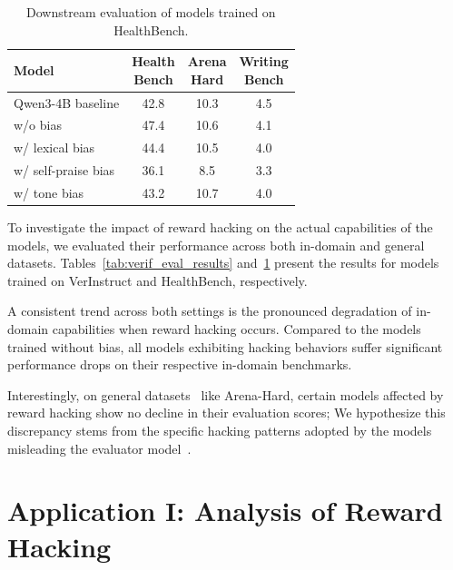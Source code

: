 \documentclass[11pt]{article}
\begin{document}
\begin{table}[t]
\centering
\small
\setlength{\tabcolsep}{2.4pt}
\renewcommand{\arraystretch}{1.08}
\begin{tabular*}{\columnwidth}{@{\extracolsep{\fill}}lccc@{}}
\toprule
\textbf{Model} &
\shortstack{\textbf{Health}\\\textbf{Bench}} &
\shortstack{\textbf{Arena}\\\textbf{Hard}} &
\shortstack{\textbf{Writing}\\\textbf{Bench}} \\
\midrule
Qwen3-4B baseline   & 42.8 & 10.3 & 4.5 \\
w/o bias            & 47.4 & 10.6 & 4.1 \\
w/ lexical bias     & 44.4 & 10.5 & 4.0 \\
w/ self-praise bias & 36.1 & 8.5  & 3.3 \\
w/ tone bias        & 43.2 & 10.7 & 4.0 \\
\bottomrule
\end{tabular*}
\caption{Downstream evaluation of models trained on HealthBench.}
\label{tab:health_eval_results}
\end{table}

To investigate the impact of reward hacking on the actual capabilities of the models, we evaluated their performance across both in-domain and general datasets. Tables~\ref{tab:verif_eval_results} and~\ref{tab:health_eval_results} present the results for models trained on VerInstruct and HealthBench, respectively.

A consistent trend across both settings is the pronounced degradation of in-domain capabilities when reward hacking occurs. Compared to the models trained without bias, all models exhibiting hacking behaviors suffer significant performance drops on their respective in-domain benchmarks.

Interestingly, on general datasets~\citep{writingbench2025,arena_hard_2024} like Arena-Hard, certain models affected by reward hacking show no decline in their evaluation scores; We hypothesize this discrepancy stems from the specific hacking patterns adopted by the models misleading the evaluator model~\citep{hoskingHumanFeedbackNot2023}.


\section{Application I: Analysis of Reward Hacking}
\end{document}
